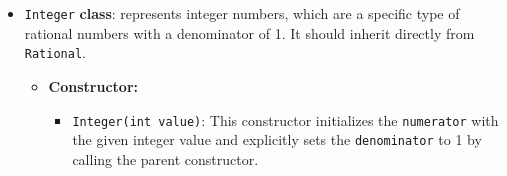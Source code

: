 \begin{enumerate}
\begin{itemize}
\begin{itemize}
\begin{itemize}
                            \item \texttt{int numerator}: The numerator of the rational number.

                            \item \texttt{int denominator}: The denominator of the rational number.

                        \end{itemize}

                    \item \textbf{Constructor:}

                        \begin{itemize}

                            \item \texttt{Rational(int numerator, int denominator)}: This constructor initializes both the \texttt{numerator} and \texttt{denominator} attributes. The decimal \texttt{value} is calculated internally by dividing the numerator by the denominator, and this result is passed to the parent class \texttt{Real} using \texttt{super()}.

                        \end{itemize}

                    \item \textbf{Methods:} Override the methods \texttt{add}, \texttt{subtract}, \texttt{multiply}, and \texttt{divide} to handle operations specifically using fractions if the other number is also a \texttt{Rational}, otherwise perform a standard decimal operation.

                \end{itemize}

            \item \texttt{Integer} \textbf{class}: represents integer numbers, which are a specific type of rational numbers with a denominator of 1. It should inherit directly from \texttt{Rational}.

                \begin{itemize}

                    \item \textbf{Constructor:}

                        \begin{itemize}

                            \item \texttt{Integer(int value)}: This constructor initializes the \texttt{numerator} with the given integer value and explicitly sets the \texttt{denominator} to 1 by calling the parent constructor.


\end{itemize}
\end{itemize}
\end{itemize}
\end{enumerate}
